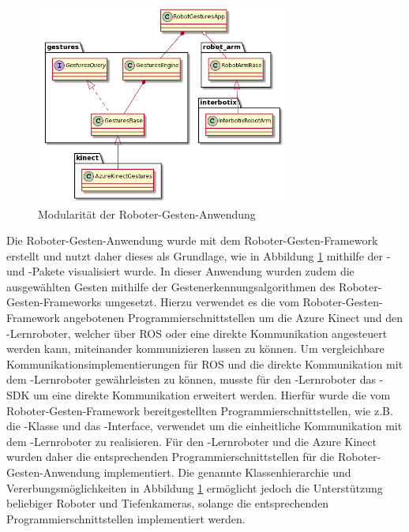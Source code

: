 \begin{figure}[htb]
	\centering
	\includegraphics[width=0.75\textwidth]{images/loesungsweg/gesture_robot_system_uml}
	\caption[Modularität der Roboter-Gesten-Anwendung]{Modularität der Roboter-Gesten-Anwendung}
	\label{fig:gesture_robot_system_uml}
\end{figure}
\FloatBarrier

Die Roboter-Gesten-Anwendung wurde mit dem Roboter-Gesten-Framework erstellt und nutzt daher dieses als Grundlage, wie in Abbildung \ref{fig:gesture_robot_system_uml} mithilfe der - und -Pakete visualisiert wurde. In dieser Anwendung wurden zudem die ausgewählten Gesten mithilfe der Gestenerkennungsalgorithmen des Roboter-Gesten-Frameworks umgesetzt. Hierzu verwendet es die vom Roboter-Gesten-Framework angebotenen Programmierschnittstellen um die Azure Kinect und den -Lernroboter, welcher über ROS oder eine direkte Kommunikation angesteuert werden kann, miteinander kommunizieren lassen zu können. Um vergleichbare Kommunikationsimplementierungen für ROS und die direkte Kommunikation mit dem -Lernroboter gewährleisten zu können, musste für den -Lernroboter das -SDK um eine direkte Kommunikation erweitert werden. Hierfür wurde die vom Roboter-Gesten-Framework bereitgestellten Programmierschnittstellen, wie z.B. die -Klasse und das -Interface, verwendet um die einheitliche Kommunikation mit dem -Lernroboter zu realisieren. Für den -Lernroboter und die Azure Kinect wurden daher die entsprechenden Programmierschnittstellen für die Roboter-Gesten-Anwendung implementiert. Die genannte Klassenhierarchie und Vererbungsmöglichkeiten in Abbildung \ref{fig:gesture_robot_system_uml} ermöglicht jedoch die Unterstützung beliebiger Roboter und Tiefenkameras, solange die entsprechenden Programmierschnittstellen implementiert werden.\\

